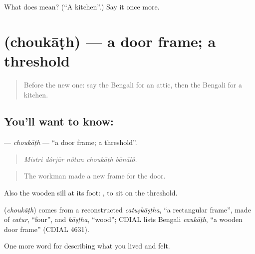 \begin{tcolorbox}[breakable,colback=teal!4,colframe=teal!35!black,title={Before you move on}]
What does  mean? (\textquotedblleft{}A kitchen\textquotedblright{}.) Say it once more.
\end{tcolorbox}
\section[\texorpdfstring{\bn{চৌকাঠ} (choukāṭh)}{চৌকাঠ (choukāṭh)}]{ (choukāṭh) — a door frame; a threshold}

\label{lesson:BN-C508-choukath}



\begin{quote}
Before the new one: say the Bengali for an attic, then the Bengali for a kitchen.
\end{quote}

\subsection*{You'll want to know: }
\textbf{} — \emph{choukāṭh} — \textquotedblleft{}a door frame; a threshold\textquotedblright{}.

\begin{quote}
    
\end{quote}

\begin{quote}
\emph{Mistri dôrjār nôtun choukāṭh bānālô.}
\end{quote}

\begin{quote}
The workman made a new frame for the door.
\end{quote}

Also the wooden sill at its foot:  , to sit on the threshold.

\begin{cousinweb}
\textbf{} (\emph{choukāṭh}) comes from a reconstructed \emph{catuṣkāṣṭha}, \textquotedblleft{}a rectangular frame\textquotedblright{}, made of \emph{catur}, \textquotedblleft{}four\textquotedblright{}, and \emph{kāṣṭha}, \textquotedblleft{}wood\textquotedblright{}; CDIAL lists Bengali \emph{caukāṭh}, \textquotedblleft{}a wooden door frame\textquotedblright{} (CDIAL 4631).
\end{cousinweb}

\begin{grammarlens}[title={What you've built}]
One more word for describing what you lived and felt.
\end{grammarlens}

